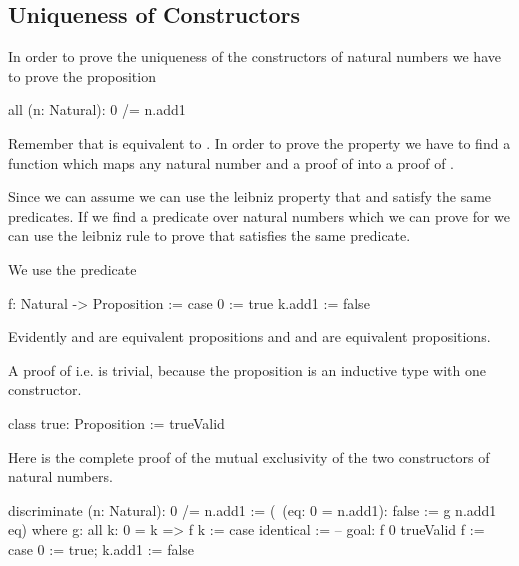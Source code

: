 \subsection{Uniqueness of Constructors}

In order to prove the uniqueness of the constructors of natural numbers we have
to prove the proposition

\begin{alba}
    all (n: Natural): 0 /= n.add1
\end{alba}

Remember that  is equivalent to . In order to prove the property we have to find a function which
maps any natural number  and a proof of  into a
proof of .

Since we can assume  we can use the leibniz property that
 and  satisfy the same predicates. If we find a
predicate over natural numbers which we can prove for  we can use the
leibniz rule to prove that  satisfies the same predicate.

We use the predicate
\begin{alba}
    f: Natural -> Proposition :=
        case
            0 :=
                true
            k.add1 :=
                false
\end{alba}

Evidently  and  are equivalent propositions and  and  are equivalent propositions.

A proof of  i.e.  is trivial, because the proposition
 is an inductive type with one constructor.

\begin{alba}
    class true: Proposition := trueValid
\end{alba}


Here is the complete proof of the mutual exclusivity of the two constructors of
natural numbers.


\begin{alba}
    discriminate (n: Natural): 0 /= n.add1
    :=
        (\ (eq: 0 = n.add1): false := g n.add1 eq)
        where
            g: all k: 0 = k => f k :=
                case
                    identical :=
                        -- goal: f 0
                        trueValid
            f :=
                case 0 := true; k.add1 := false
\end{alba}


